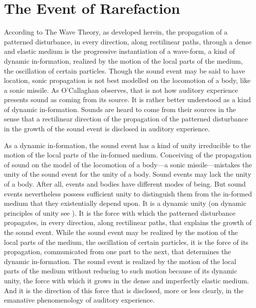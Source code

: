 \documentclass[12pt]{article}
\begin{document}

\section{The Event of Rarefaction} %
\label{sec:the_event_of_rarefaction}

According to The Wave Theory, as developed herein, the propagation of a patterned disturbance, in every direction, along rectilinear paths, through a dense and elastic medium is the progressive instantiation of a wave-form, a kind of dynamic in-formation, realized by the motion of the local parts of the medium, the oscillation of certain particles. Though the sound event may be said to have location, sonic propagation is not best modelled on the locomotion of a body, like a sonic missile. As O’Callaghan observes, that is not how auditory experience presents sound as coming from its source. It is rather better understood as a kind of dynamic in-formation. Sounds are heard to come from their sources in the sense that a rectilinear direction of the propagation of the patterned disturbance in the growth of the sound event is disclosed in auditory experience. 

As a dynamic in-formation, the sound event has a kind of unity irreducible to the motion of the local parts of the in-formed medium. Conceiving of the propagation of sound on the model of the locomotion of a body---a sonic missile---mistakes the unity of the sound event for the unity of a body. Sound events may lack the unity of a body. After all, events and bodies have different modes of being. But sound events nevertheless possess sufficient unity to distinguish them from the in-formed medium that they existentially depend upon. It is a dynamic unity (on dynamic principles of unity see \citealt{Johnston:2006js}). It is the force with which the patterned disturbance propagates, in every direction, along rectilinear paths, that explains the growth of the sound event. While the sound event may be realized by the motion of the local parts of the medium, the oscillation of certain particles, it is the force of its propagation, communicated from one part to the next, that determines the dynamic in-formation. The sound event is realized by the motion of the local parts of the medium without reducing to such motion because of its dynamic unity, the force with which it grows in the dense and imperfectly elastic medium. And it is the direction of this force that is disclosed, more or less clearly, in the emanative phenomenology of auditory experience.
\end{document}
